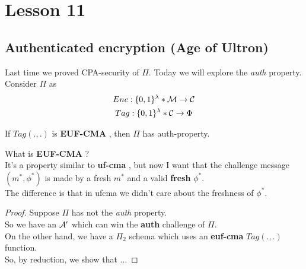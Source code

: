 \chapter*{Lesson 11}
\section{Authenticated encryption (Age of Ultron)}
Last time we proved CPA-security of $\Pi$. Today we will explore the
\textit{auth}  property.
Consider $\Pi$ as
    \begin{gather*}
        Enc:\{0,1\}^{\lambda}*\mathcal{M} \to \mathcal{C} \\
        Tag:\{0,1\}^{\lambda}*\mathcal{C} \to \Phi 
    \end{gather*}
   
    \begin{lemma}
        If $Tag(.,.)$ is \textbf{EUF-CMA} , then $\Pi$ has
    auth-property. 
    \end{lemma}
    
    What is \textbf{EUF-CMA} ?\\ 
    It's a property similar to \textbf{uf-cma} ,
    but now I want that the challenge message $(m^{*}, \phi^{*})$ is made by a
    fresh $m^{*}$ and a valid \textbf{fresh} $\phi^{*}$.\\ 
    The difference is that in ufcma we didn't care about the freshness of
    $\phi^{*}$.

\begin{proof}
    Suppose $\Pi$ has not the \textit{auth}  property.\\ 
    So we have an $\mathcal{A}'$ which can win the \textbf{auth} challenge of $\Pi$.\\
    On the other hand, we have a $\Pi_{2}$ schema which uses an \textbf{euf-cma}
    $Tag(.,.)$ function.\\
    So, by reduction, we show that ...






\end{proof}
    
